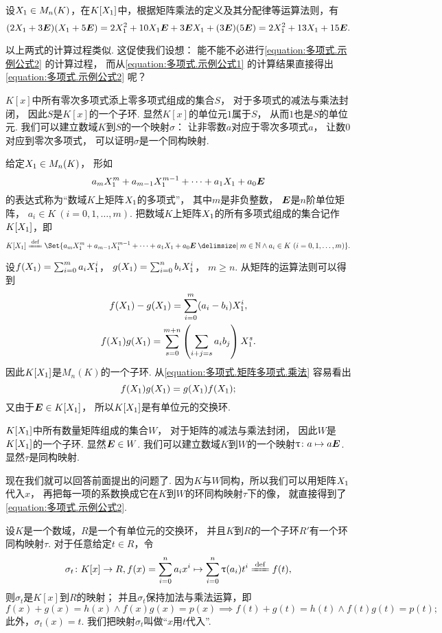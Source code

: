 设\(X_1 \in M_n(K)\)，在\(K[X_1]\)中，根据矩阵乘法的定义及其分配律等运算法则，有
\begin{equation}\label{equation:多项式.示例公式2}
	(2X_1+3\boldsymbol{E})(X_1+5\boldsymbol{E})
	=2X_1^2+10X_1\boldsymbol{E}+3\boldsymbol{E}X_1+(3\boldsymbol{E})(5\boldsymbol{E})
	=2X_1^2+13X_1+15\boldsymbol{E}.
\end{equation}

以上两式的计算过程类似.
这促使我们设想：
能不能不必进行\cref{equation:多项式.示例公式2} 的计算过程，
而从\cref{equation:多项式.示例公式1}
的计算结果直接得出\cref{equation:多项式.示例公式2} 呢？

\(K[x]\)中所有零次多项式添上零多项式组成的集合\(S\)，
对于多项式的减法与乘法封闭，
因此\(S\)是\(K[x]\)的一个子环.
显然\(K[x]\)的单位元\(1\)属于\(S\)，
从而\(1\)也是\(S\)的单位元.
我们可以建立数域\(K\)到\(S\)的一个映射\(\sigma\)：
让非零数\(a\)对应于零次多项式\(a\)，
让数\(0\)对应到零次多项式，
可以证明\(\sigma\)是一个同构映射.

给定\(X_1\in M_n(K)\)，
形如\[
	a_m X_1^m + a_{m-1} X_1^{m-1} + \dotsb + a_1 X_1 + a_0 \boldsymbol{E}
\]的表达式称为“数域\(K\)上矩阵\(X_1\)的多项式”，
其中\(m\)是非负整数，
\(\boldsymbol{E}\)是\(n\)阶单位矩阵，
\(a_i \in K\ (i=0,1,\dotsc,m)\).
把数域\(K\)上矩阵\(X_1\)的所有多项式组成的集合记作\(K[X_1]\)，即\[
	K[\A]
	\defeq
	\Set{
		a_m \A^m + a_{m-1} \A^{m-1} + \dotsb + a_1 \A + a_0 \E
		\given
		m \in \mathbb{N}
		\land
		a_i \in K\ (i=0,1,\dotsc,m)
	}.
\]

设\(f(X_1)=\sum_{i=0}^m a_i X_1^i\)，
\(g(X_1)=\sum_{i=0}^n b_i X_1^i\)，
\(m \geq n\).
从矩阵的运算法则可以得到
\begin{gather}
	f(X_1)-g(X_1)
	= \sum_{i=0}^m (a_i - b_i) X_1^i, \\
	f(X_1) g(X_1)
	= \sum_{s=0}^{m+n} \left( \sum_{i+j=s} a_i b_j \right) X_1^s.
	\label{equation:多项式.矩阵多项式.乘法}
\end{gather}
因此\(K[X_1]\)是\(M_n(K)\)的一个子环.
从\cref{equation:多项式.矩阵多项式.乘法} 容易看出\[
	f(X_1) g(X_1) = g(X_1) f(X_1);
\]
又由于\(\boldsymbol{E} \in K[X_1]\)，
所以\(K[X_1]\)是有单位元的交换环.

\(K[X_1]\)中所有数量矩阵组成的集合\(W\)，
对于矩阵的减法与乘法封闭，
因此\(W\)是\(K[X_1]\)的一个子环.
显然\(\boldsymbol{E} \in W\).
我们可以建立数域\(K\)到\(W\)的一个映射\(\uptau\colon a \mapsto a \boldsymbol{E}\).
显然\(\tau\)是同构映射.

现在我们就可以回答前面提出的问题了.
因为\(K\)与\(W\)同构，所以我们可以用矩阵\(X_1\)代入\(x\)，
再把每一项的系数换成它在\(K\)到\(W\)的环同构映射\(\tau\)下的像，
就直接得到了\cref{equation:多项式.示例公式2}.

\begin{theorem}\label{theorem:多项式.多项式环的同构映射}
设\(K\)是一个数域，\(R\)是一个有单位元的交换环，
并且\(K\)到\(R\)的一个子环\(R'\)有一个环同构映射\(\tau\).
对于任意给定\(t \in R\)，令\[
	\sigma_t\colon
	K[x] \to R,
	f(x)=\sum_{i=0}^n a_i x^i \mapsto \sum_{i=0}^n \tau(a_i) t^i \defeq f(t),
\]
则\(\sigma_t\)是\(K[x]\)到\(R\)的映射；
并且\(\sigma_t\)保持加法与乘法运算，即\[
	f(x)+g(x)=h(x) \land f(x) g(x) = p(x)
	\implies
	f(t)+g(t)=h(t) \land f(t) g(t) = p(t);
\]
此外，\(\sigma_t(x) = t\).
我们把映射\(\sigma_t\)叫做“\(x\)用\(t\)代入”.
\end{theorem}

